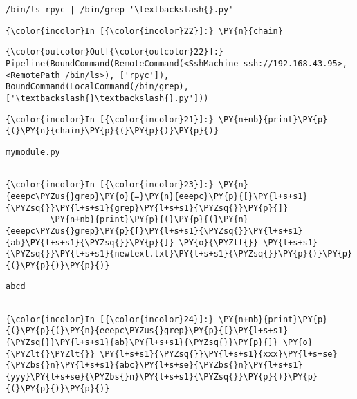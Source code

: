     \begin{Verbatim}[commandchars=\\\{\}]
/bin/ls rpyc | /bin/grep '\textbackslash{}.py'

    \end{Verbatim}

    \begin{Verbatim}[commandchars=\\\{\}]
{\color{incolor}In [{\color{incolor}22}]:} \PY{n}{chain}
\end{Verbatim}


\begin{Verbatim}[commandchars=\\\{\}]
{\color{outcolor}Out[{\color{outcolor}22}]:} Pipeline(BoundCommand(RemoteCommand(<SshMachine ssh://192.168.43.95>, <RemotePath /bin/ls>), ['rpyc']), BoundCommand(LocalCommand(/bin/grep), ['\textbackslash{}\textbackslash{}.py']))
\end{Verbatim}
            
    \begin{Verbatim}[commandchars=\\\{\}]
{\color{incolor}In [{\color{incolor}21}]:} \PY{n+nb}{print}\PY{p}{(}\PY{n}{chain}\PY{p}{(}\PY{p}{)}\PY{p}{)}
\end{Verbatim}


    \begin{Verbatim}[commandchars=\\\{\}]
mymodule.py


    \end{Verbatim}

    \begin{Verbatim}[commandchars=\\\{\}]
{\color{incolor}In [{\color{incolor}23}]:} \PY{n}{eeepc\PYZus{}grep}\PY{o}{=}\PY{n}{eeepc}\PY{p}{[}\PY{l+s+s1}{\PYZsq{}}\PY{l+s+s1}{grep}\PY{l+s+s1}{\PYZsq{}}\PY{p}{]}
         \PY{n+nb}{print}\PY{p}{(}\PY{p}{(}\PY{n}{eeepc\PYZus{}grep}\PY{p}{[}\PY{l+s+s1}{\PYZsq{}}\PY{l+s+s1}{ab}\PY{l+s+s1}{\PYZsq{}}\PY{p}{]} \PY{o}{\PYZlt{}} \PY{l+s+s1}{\PYZsq{}}\PY{l+s+s1}{newtext.txt}\PY{l+s+s1}{\PYZsq{}}\PY{p}{)}\PY{p}{(}\PY{p}{)}\PY{p}{)}
\end{Verbatim}


    \begin{Verbatim}[commandchars=\\\{\}]
abcd


    \end{Verbatim}

    \begin{Verbatim}[commandchars=\\\{\}]
{\color{incolor}In [{\color{incolor}24}]:} \PY{n+nb}{print}\PY{p}{(}\PY{p}{(}\PY{n}{eeepc\PYZus{}grep}\PY{p}{[}\PY{l+s+s1}{\PYZsq{}}\PY{l+s+s1}{ab}\PY{l+s+s1}{\PYZsq{}}\PY{p}{]} \PY{o}{\PYZlt{}\PYZlt{}} \PY{l+s+s1}{\PYZsq{}}\PY{l+s+s1}{xxx}\PY{l+s+se}{\PYZbs{}n}\PY{l+s+s1}{abc}\PY{l+s+se}{\PYZbs{}n}\PY{l+s+s1}{yyy}\PY{l+s+se}{\PYZbs{}n}\PY{l+s+s1}{\PYZsq{}}\PY{p}{)}\PY{p}{(}\PY{p}{)}\PY{p}{)}
\end{Verbatim}


